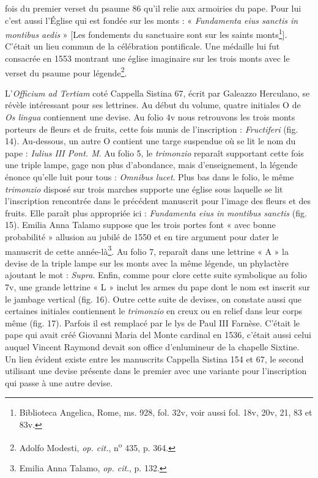 \documentclass[12pt,twoside,openany]{book}
\begin{document}
fois du premier verset du psaume 86 qu’il relie aux armoiries du pape. Pour lui c’est aussi l’Église qui est fondée sur les monts : « \textit{Fundamenta eius sanctis in montibus aedis} » [Les fondements du sanctuaire sont sur les saints monts\footnote{Biblioteca Angelica, Rome, ms. 928, fol. 32v, voir aussi fol. 18v, 20v, 21, 83 et 83v.}]. C’était un lieu commun de la célébration pontificale. Une médaille lui fut consacrée en 1553 montrant une église imaginaire sur les trois monts avec le verset du psaume pour légende\footnote{Adolfo Modesti, \textit{op. cit.}, n\textsuperscript{o} 435, p. 364.}.

L’\textit{Officium ad Tertiam }coté Cappella Sistina 67, écrit par Galeazzo Herculano, se révèle intéressant pour ses lettrines. Au début du volume, quatre initiales O de \textit{Os lingua} contiennent une devise. Au folio 4v nous retrouvons les trois monts porteurs de fleurs et de fruits, cette fois munis de l’inscription : \textit{Fructiferi} (fig. 14). Au-dessous, un autre O contient une targe suspendue où se lit le nom du pape : \textit{Iulius III Pont. M}. Au folio 5, le \textit{trimonzio} reparaît supportant cette fois une triple lampe, gage non plus d’abondance, mais d’enseignement, la légende énonce qu’elle luit pour tous : \textit{Omnibus lucet}. Plus bas dans le folio, le même \textit{trimonzio} disposé sur trois marches supporte une église sous laquelle se lit l’inscription rencontrée dans le précédent manuscrit pour l’image des fleurs et des fruits. Elle paraît plus appropriée ici : \textit{Fundamenta eius in montibus sanctis} (fig. 15). Emilia Anna Talamo suppose que les trois portes font « avec bonne probabilité » allusion au jubilé de 1550 et en tire argument pour dater le manuscrit de cette année-là\footnote{Emilia Anna Talamo,\textit{ op. cit}., p. 132.}. Au folio 7, reparaît dans une lettrine « A » la devise de la triple lampe sur les monts avec la même légende, un phylactère ajoutant le mot : \textit{Supra}. Enfin, comme pour clore cette suite symbolique au folio 7v, une grande lettrine « L » inclut les armes du pape dont le nom est inscrit sur le jambage vertical (fig. 16). Outre cette suite de devises, on constate aussi que certaines initiales contiennent le \textit{trimonzio} en creux ou en relief dans leur corps même (fig. 17). Parfois il est remplacé par le lys de Paul III Farnèse. C’était le pape qui avait créé Giovanni Maria del Monte cardinal en 1536, c’était aussi celui auquel Vincent Raymond devait son office d’enlumineur de la chapelle Sixtine. Un lien évident existe entre les manuscrits Cappella Sistina 154 et 67, le second utilisant une devise présente dans le premier avec une variante pour l’inscription qui passe à une autre devise.
\end{document}
